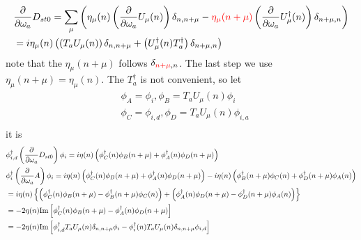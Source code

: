 \begin{equation}
\begin{split}
&\frac{\partial }{\partial \omega _a}  D_{st0}=\sum _{\mu}\left(\eta _{\mu}(n)\left(\frac{\partial }{\partial \omega _a}U_{\mu}(n)\right) \delta _{n,n+\mu} - \textcolor[rgb]{1,0,0}{\eta _{\mu}(n+\mu)}\left(\frac{\partial }{\partial \omega _a} U^{\dagger}_{\mu}(n)\right)\delta _{n+\mu,n}\right)\\
&=i\eta _{\mu}(n)\left(\left(T_aU_{\mu}(n)\right) \delta _{n,n+\mu} + \left(U^{\dagger}_{\mu}(n)T_a^{\dagger}\right)\delta _{n+\mu,n}\right)\\
\end{split}
\end{equation}
note that the $\eta _{\mu} (n+\mu)$ follows $\delta _{\textcolor[rgb]{1,0,0}{n+\mu},n}$. The last step we use $\eta _{\mu}(n+\mu)=\eta_{\mu}(n)$.
The $T_a^{\dagger}$ is not convenient, so let
\begin{equation}
\begin{split}
&\phi _A = \phi _i, \phi _B = T_aU_{\mu}(n)\phi _i\\
&\phi _C = \phi _{i,d}, \phi _D = T_aU_{\mu}(n)\phi _{i,a}\\
\end{split}
\end{equation}
it is
\begin{equation}
\begin{split}
&\phi _{i,d}^{\dagger}\left(\frac{\partial }{\partial \omega _a}D_{st0}\right)\phi _i = i\eta(n)\left(\phi _C^{\dagger}(n)\phi _B(n+\mu) + \phi _A^{\dagger}(n)\phi _D(n+\mu)\right)\\
&\phi _i^{\dagger}\left(\frac{\partial }{\partial \omega _a}A\right)\phi _i=i\eta(n)\left(\phi _C^{\dagger}(n)\phi _B(n+\mu) + \phi _A^{\dagger}(n)\phi _D(n+\mu)\right)-i\eta(n)\left(\phi _B^{\dagger}(n+\mu)\phi _C(n) + \phi _D^{\dagger}(n+\mu)\phi _A(n)\right)\\
&=i\eta (n)\left\{\left(\phi _C^{\dagger}(n)\phi _B(n+\mu)-\phi _B^{\dagger}(n+\mu)\phi _C(n)\right)+\left( \phi _A^{\dagger}(n)\phi _D(n+\mu)-\phi _D^{\dagger}(n+\mu)\phi _A(n)\right)\right\}\\
&=-2\eta (n) {\rm Im}\left[\phi _C^{\dagger}(n)\phi _B(n+\mu) - \phi _A^{\dagger}(n)\phi _D(n+\mu)\right]\\
&=-2\eta (n) {\rm Im}\left[\phi _{i,d}^{\dagger}T_aU_{\mu}(n) \delta _{n,n+\mu}\phi _i - \phi _i^{\dagger}(n)T_aU_{\mu}(n)\delta _{n,n+\mu}\phi _{i,d}\right]\\
\end{split}
\end{equation}
